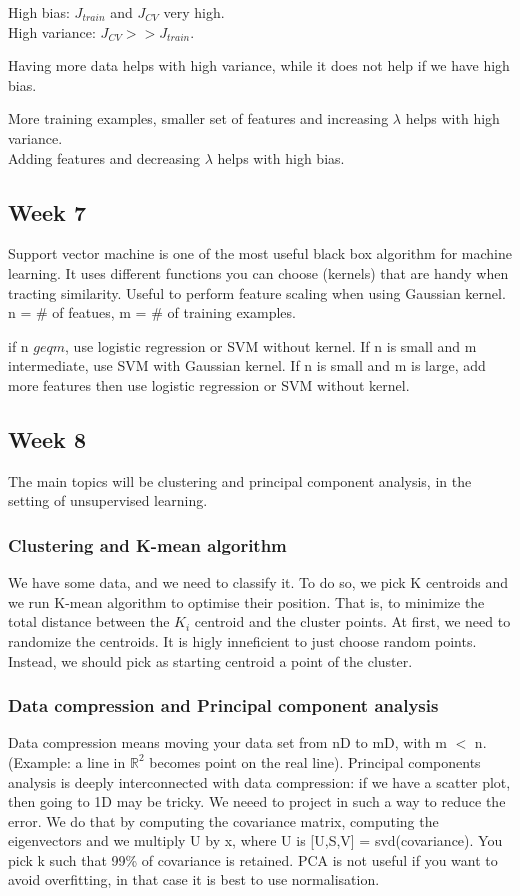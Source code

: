 \documentclass{article}
\begin{document}
High bias: $J_{train}$ and $J_{CV}$ very high. \\
High variance: $J_{CV} >> J_{train}$.

Having more data helps with high variance, while it does not help if we have
high bias.

More training examples, smaller set of features and increasing $\lambda$ helps
with high variance. \\
Adding features and decreasing $\lambda$ helps with high bias.

\subsection{Week 7}
Support vector machine is one of the most useful black box algorithm for machine
learning. It uses different functions you can choose (kernels) that are handy
when tracting similarity. Useful to perform feature scaling when using Gaussian
kernel. n = # of featues, m = # of training examples.

if n $geq m$, use logistic regression or SVM without kernel.
If n is small and m intermediate, use SVM with Gaussian kernel.
If n is small and m is large, add more features then use logistic regression or
SVM without kernel.

\subsection{Week 8}
The main topics will be clustering and principal component analysis, in the
setting of unsupervised learning.

\subsubsection{Clustering and K-mean algorithm}
We have some data, and we need to classify it. To do so, we pick K centroids and
we run K-mean algorithm to optimise their position. That is, to minimize the
total distance between the $K_i$ centroid and the cluster points. At first,
we need to randomize the centroids. It is higly inneficient to just choose random
points. Instead, we should pick as starting centroid a point of the cluster.

\subsubsection{Data compression and Principal component analysis}

Data compression means moving your data set from nD to mD, with m $<$ n.
(Example: a line in $\mathbb{R}^2$ becomes point on the real line).
Principal components analysis is deeply interconnected with data compression:
if we have a scatter plot, then going to 1D may be tricky.
We neeed to project in such a way to reduce the error.
We do that by computing the covariance matrix, computing the eigenvectors and we
multiply U by x, where U is [U,S,V] = svd(covariance). You pick k such that
99\% of covariance is retained.
PCA is not useful if you want to avoid overfitting, in that case it is best to
use normalisation.
\end{document}
